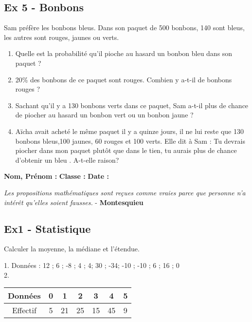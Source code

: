 \documentclass[11pt]{article}
\begin{document}
\begin{multicols}{2}
  \subsection*{Ex 5 - Bonbons}
  Sam préfère les bonbons bleus. 
  Dans son paquet de 500 bonbons, 140 sont bleus, les autres sont rouges, jaunes ou verts.

  \begin{enumerate}
  \item Quelle est la probabilité qu’il pioche au hasard un bonbon bleu dans son paquet ?
  \item 20\% des bonbons de ce paquet sont rouges. Combien y a-t-il de bonbons rouges ?
  \item Sachant qu’il y a 130 bonbons verts dans ce paquet, Sam a-t-il plus de chance de piocher au hasard un bonbon vert ou un bonbon jaune ?
  \item Aïcha avait acheté le même paquet il y a quinze jours, il ne lui reste que 130 bonbons bleus,100 jaunes, 60 rouges et 100 verts. Elle dit à Sam : \og Tu devrais piocher dans mon paquet plutôt que dans le tien, tu aurais plus de chance d’obtenir un bleu \fg.
    A-t-elle raison? 
  \end{enumerate}
\end{multicols}


\newpage

\textbf{Nom, Prénom :} \hspace{8cm} \textbf{Classe :} \hspace{3cm} \textbf{Date :}\\
\vspace{-0.8cm}
\begin{center}
  \textit{Les propositions mathématiques sont reçues comme vraies parce que personne n'a intérêt qu'elles soient fausses.}  - \textbf{Montesquieu}
\end{center}
\vspace{-0.8cm}

\subsection*{Ex1 - Statistique}
Calculer la moyenne, la médiane et l'étendue.
\begin{multicols}{2}
1. Données : 12 ; 6 ; -8 ; 4 ; 4; 30 ; -34; -10 ; -10 ; 6 ; 16 ; 0 \\
2.    \begin{tabular}{|c|c|c|c|c|c|c|}
      \hline
      Données  & 0 & 1 & 2 & 3 & 4 & 5 \\  \hline
      Effectif & 5  & 21  & 25  & 15 & 45  & 9 \\  \hline
    \end{tabular}
\end{multicols}
\end{document}
